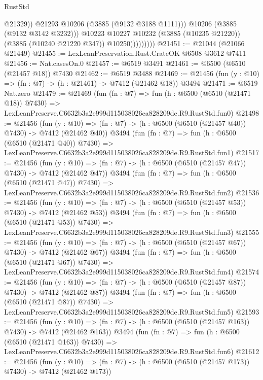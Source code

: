 \begin{lexlean}{RustStd}
\begin{coremodule}
                              @21329))
                          @21293
                          @10206
                          (@3885 (@9132 @3188 @1111)))
                        @10206
                        (@3885 (@9132 @3142 @3232)))
                      @10223
                      @10227
                      @10232
                      (@3885 (@10235 @21220))
                      (@3885 (@10240 @21220 @347))
                      @10250)))))))))
@21451 := @21044 (@21066 @21449)
@21455 := LexLeanPreservation.Rust.CrateOK @6508 @3612 @7411
@21456 := Nat.casesOn.{0}
@21457 := @6519 @3491
@21461 := @6500 (@6510 (@21457 @18)) @7430
@21462 := @6519 @3488
@21469 := @21456 (fun (y : @10) => (fn : @7) -> (h : @21461) -> @7412 (@21462 @18)) @3494
@21471 := @6519 Nat.zero
@21479 := @21469
    (fun (fn : @7) =>
    fun (h : @6500 (@6510 (@21471 @18)) @7430) =>
    LexLeanPreserve.C6632b3a2e999d115038026ca828209de.R9.RustStd.fun0)
@21498 := @21456
    (fun (y : @10) => (fn : @7) -> (h : @6500 (@6510 (@21457 @40)) @7430) -> @7412 (@21462 @40))
    @3494
    (fun (fn : @7) =>
    fun (h : @6500 (@6510 (@21471 @40)) @7430) =>
    LexLeanPreserve.C6632b3a2e999d115038026ca828209de.R9.RustStd.fun1)
@21517 := @21456
    (fun (y : @10) => (fn : @7) -> (h : @6500 (@6510 (@21457 @47)) @7430) -> @7412 (@21462 @47))
    @3494
    (fun (fn : @7) =>
    fun (h : @6500 (@6510 (@21471 @47)) @7430) =>
    LexLeanPreserve.C6632b3a2e999d115038026ca828209de.R9.RustStd.fun2)
@21536 := @21456
    (fun (y : @10) => (fn : @7) -> (h : @6500 (@6510 (@21457 @53)) @7430) -> @7412 (@21462 @53))
    @3494
    (fun (fn : @7) =>
    fun (h : @6500 (@6510 (@21471 @53)) @7430) =>
    LexLeanPreserve.C6632b3a2e999d115038026ca828209de.R9.RustStd.fun3)
@21555 := @21456
    (fun (y : @10) => (fn : @7) -> (h : @6500 (@6510 (@21457 @67)) @7430) -> @7412 (@21462 @67))
    @3494
    (fun (fn : @7) =>
    fun (h : @6500 (@6510 (@21471 @67)) @7430) =>
    LexLeanPreserve.C6632b3a2e999d115038026ca828209de.R9.RustStd.fun4)
@21574 := @21456
    (fun (y : @10) => (fn : @7) -> (h : @6500 (@6510 (@21457 @87)) @7430) -> @7412 (@21462 @87))
    @3494
    (fun (fn : @7) =>
    fun (h : @6500 (@6510 (@21471 @87)) @7430) =>
    LexLeanPreserve.C6632b3a2e999d115038026ca828209de.R9.RustStd.fun5)
@21593 := @21456
    (fun (y : @10) => (fn : @7) -> (h : @6500 (@6510 (@21457 @163)) @7430) -> @7412 (@21462 @163))
    @3494
    (fun (fn : @7) =>
    fun (h : @6500 (@6510 (@21471 @163)) @7430) =>
    LexLeanPreserve.C6632b3a2e999d115038026ca828209de.R9.RustStd.fun6)
@21612 := @21456
    (fun (y : @10) => (fn : @7) -> (h : @6500 (@6510 (@21457 @173)) @7430) -> @7412 (@21462 @173))

\end{coremodule}
\end{lexlean}
